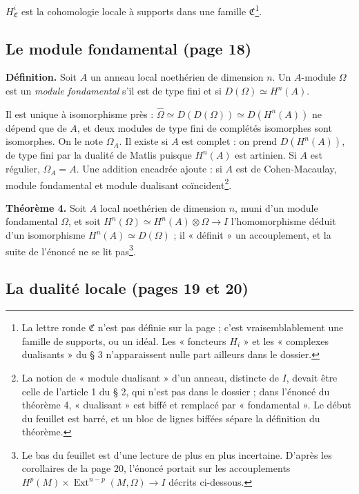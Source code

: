 \documentclass[11pt,a4paper]{article}
\begin{document}
$H^i_{\mathfrak{C}}$ est la cohomologie locale à supports dans une famille
$\mathfrak{C}$\footnote{La lettre ronde $\mathfrak{C}$ n'est pas définie sur la
page ; c'est vraisemblablement une famille de supports, ou un idéal. Les
« foncteurs $H_i$ » et les « complexes dualisants » du § 3 n'apparaissent nulle
part ailleurs dans le dossier.}.

\subsection*{Le module fondamental (page 18)}

\textbf{Définition.} Soit $A$ un anneau local noethérien de dimension $n$. Un
$A$-module $\Omega$ est un \emph{module fondamental} s'il est de type fini et
si $D(\Omega) \simeq H^n(A)$.

Il est unique à isomorphisme près : $\widehat{\Omega} \simeq D(D(\Omega))
\simeq D(H^n(A))$ ne dépend que de $A$, et deux modules de type fini de
complétés isomorphes sont isomorphes. On le note $\Omega_A$. Il existe si $A$
est complet : on prend $D(H^n(A))$, de type fini par la dualité de Matlis
puisque $H^n(A)$ est artinien. Si $A$ est régulier, $\Omega_A = A$. Une
addition encadrée ajoute : si $A$ est de Cohen-Macaulay, module fondamental et
module dualisant coïncident\footnote{La notion de « module dualisant » d'un
anneau, distincte de $I$, devait être celle de l'article 1 du § 2, qui n'est
pas dans le dossier ; dans l'énoncé du théorème 4, « dualisant » est biffé et
remplacé par « fondamental ». Le début du feuillet est barré, et un bloc de
lignes biffées sépare la définition du théorème.}.

\textbf{Théorème 4.} Soit $A$ local noethérien de dimension $n$, muni d'un
module fondamental $\Omega$, et soit $H^n(\Omega) \simeq H^n(A) \otimes \Omega
\to I$ l'homomorphisme déduit d'un isomorphisme $H^n(A) \simeq D(\Omega)$ ; il
« définit » un accouplement, et la suite de l'énoncé ne se lit pas\footnote{Le bas du feuillet est d'une lecture
de plus en plus incertaine. D'après les corollaires de la page 20, l'énoncé
portait sur les accouplements $H^p(M) \times \operatorname{Ext}^{n-p}(M,
\Omega) \to I$ décrits ci-dessous.}.

\subsection*{La dualité locale (pages 19 et 20)}
\end{document}
